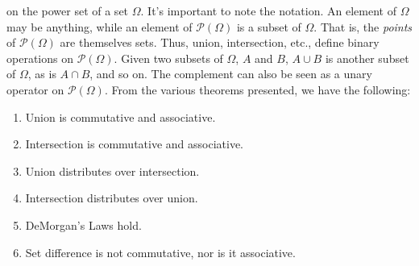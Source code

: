             on the power set of a set $\Omega$. It's important
            to note the notation. An element of $\Omega$ may
            be anything, while an element of
            $\mathcal{P}(\Omega)$ is a subset of $\Omega$.
            That is, the \textit{points} of $\mathcal{P}(\Omega)$
            are themselves sets. Thus, union, intersection,
            etc., define binary operations on
            $\mathcal{P}(\Omega)$. Given two subsets of
            $\Omega$, $A$ and $B$, $A\cup{B}$ is another
            subset of $\Omega$, as is $A\cap{B}$, and so on.
            The complement can also be seen as a unary operator
            on $\mathcal{P}(\Omega)$. From the various theorems
            presented, we have the following:
            \begin{enumerate}
                \item Union is commutative and associative.
                \item Intersection is commutative and
                      associative.
                \item Union distributes over intersection.
                \item Intersection distributes over union.
                \item DeMorgan's Laws hold.
                \item Set difference is not commutative,
                      nor is it associative.
            \end{enumerate}
